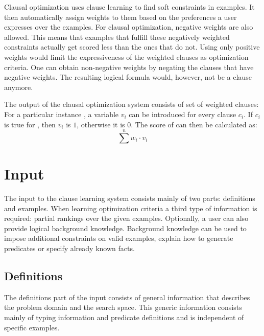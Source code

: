 Clausal optimization uses clause learning to find soft constraints in examples.
It then automatically assign weights to them based on the preferences a user expresses over the examples.
For clausal optimization, negative weights are also allowed.
This means that examples that fulfill these negatively weighted constraints actually get scored less than the ones that do not.
Using only positive weights would limit the expressiveness of the weighted clauses as optimization criteria.
One can obtain non-negative weights by negating the clauses that have negative weights.
The resulting logical formula would, however, not be a clause anymore.

The output of the clausal optimization system consists of set of weighted clauses: 
For a particular instance , a variable $v_i$ can be introduced for every clause $c_i$.
If $c_i$ is true for , then $v_i$ is $1$, otherwise it is $0$. The score of  can then be calculated as:
\begin{equation}
\label{eq:weights_sum}
\sum\limits^n w_i \cdot v_i
\end{equation}

\section{Input}
The input to the clause learning system consists mainly of two parts: definitions and examples.
When learning optimization criteria a third type of information is required: partial rankings over the given examples.
Optionally, a user can also provide logical background knowledge.
Background knowledge can be used to impose additional constraints on valid examples, explain how to generate predicates or specify already known facts.

\subsection{Definitions}
The definitions part of the input consists of general information that describes the problem domain and the search space.
This generic information consists mainly of typing information and predicate definitions and is independent of specific examples.

